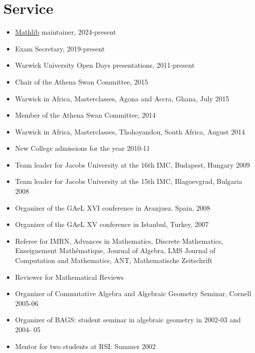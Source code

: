 \section{Service}

\begin{itemize}
\item
\href{https://github.com/leanprover-community/mathlib4}{Mathlib} maintainer, 2024-present
\item
Exam Secretary, 2019-present
\item
Warwick University Open Days presentations, 2011-present
\item
Chair of the Athena Swan Committee, 2015
\item
Warwick in Africa, Masterclasses, Agona and Accra, Ghana, July 2015
\item
Member of the Athena Swan Committee, 2014
\item
Warwick in Africa, Masterclasses, Thohoyandou, South Africa, August 2014
\item
New College admissions for the year 2010-11
\item
Team leader for Jacobs University at the 16th IMC, Budapest, Hungary 2009
\item
Team leader for Jacobs University at the 15th IMC, Blagoevgrad, Bulgaria 2008
\item
Organizer of the GAeL XVI conference in Aranjuez, Spain, 2008
\item
Organizer of the GAeL XV conference in Istanbul, Turkey, 2007
\item
Referee for IMRN, Advances in Mathematics, Discrete Mathematics, Enseignement Math\'ematique, Journal of Algebra, LMS Journal of Computation and Mathematics, ANT, Mathematische Zeitschrift
\item
Reviewer for Mathematical Reviews
\item
Organizer of Commutative Algebra and Algebraic Geometry Seminar, Cornell
2005-06
\item
Organizer of BAGS: student seminar in algebraic geometry in 2002-03 and 2004-
05
\item
Mentor for two students at RSI: Summer 2002
\end{itemize}
